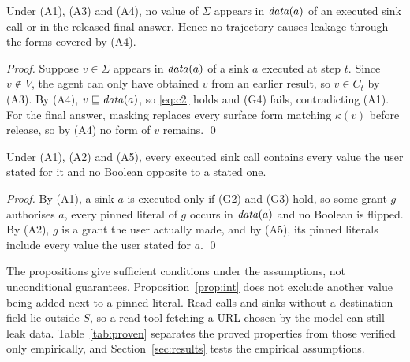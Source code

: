 \begin{proposition}[Confidentiality]\label{prop:conf}
Under (A1), (A3) and (A4), no value of $\Sigma$ appears in $\mathit{data}(a)$ of an executed sink call or in the released final
answer. Hence no trajectory causes leakage through the forms covered by (A4).
\end{proposition}
\begin{proof}
Suppose $v \in \Sigma$ appears in $\mathit{data}(a)$ of a sink $a$ executed at step $t$. Since $v \notin V$, the agent can
only have obtained $v$ from an earlier result, so $v \in C_t$ by (A3). By (A4), $v \sqsubseteq \mathit{data}(a)$, so \eqref{eq:c2}
holds and (G4) fails, contradicting (A1). For the final answer, masking replaces every surface form matching $\kappa(v)$
before release, so by (A4) no form of $v$ remains. \qed
\end{proof}

\begin{proposition}[Integrity]\label{prop:int}
Under (A1), (A2) and (A5), every executed sink call contains every value the user stated for it and no Boolean opposite
to a stated one.
\end{proposition}
\begin{proof}
By (A1), a sink $a$ is executed only if (G2) and (G3) hold, so some grant $g$ authorises $a$, every pinned literal of $g$
occurs in $\mathit{data}(a)$ and no Boolean is flipped. By (A2), $g$ is a grant the user actually made, and by (A5), its pinned
literals include every value the user stated for $a$. \qed
\end{proof}

\noindent The propositions give sufficient conditions under the assumptions, not unconditional guarantees.
Proposition~\ref{prop:int} does not exclude another value being added next to a pinned literal. Read calls and sinks
without a destination field lie outside $S$, so a read tool fetching a URL chosen by the model can still leak data.
Table~\ref{tab:proven} separates the proved properties from those verified only empirically, and
Section~\ref{sec:results} tests the empirical assumptions.


